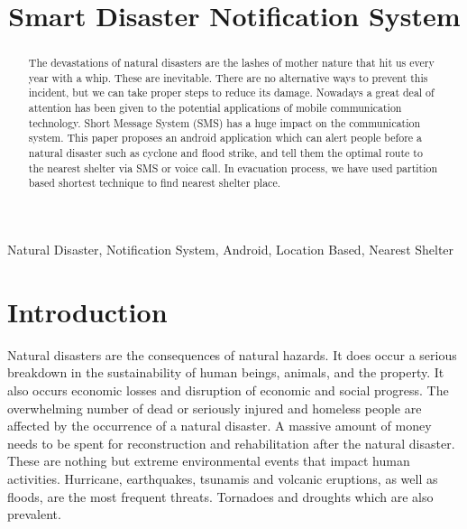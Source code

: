 \documentclass[conference]{IEEEtran}
\title{Smart Disaster Notification System}
\begin{document}
%




\author{
}

\maketitle


\begin{abstract}
The devastations of natural disasters are the lashes of mother nature that hit us every year with a whip. These are inevitable. There are no alternative ways to prevent this incident, but we can take proper steps to reduce its damage. Nowadays a great deal of attention has been given to the potential applications of mobile communication technology. Short Message System (SMS) has a huge impact on the communication system. This paper proposes an android application which can alert people before a natural disaster such as cyclone and flood strike, and tell them the optimal route to the nearest shelter via SMS or voice call. In evacuation process, we have used partition based shortest technique to find nearest shelter place. 

\end{abstract}

\begin{IEEEkeywords}
Natural Disaster, Notification System, Android, Location Based, Nearest Shelter
\end{IEEEkeywords}

\IEEEpeerreviewmaketitle
\section{Introduction}
\label{sec:Intro}

Natural disasters are the consequences of natural hazards. It does occur a serious breakdown in the sustainability of human beings, animals, and the property. It also occurs economic losses and disruption of economic and social progress. The overwhelming number of dead or seriously injured and homeless people are affected by the occurrence of a natural disaster. A massive amount of money needs to be spent for reconstruction and rehabilitation after the natural disaster. These are nothing but extreme environmental events that impact human activities. Hurricane, earthquakes, tsunamis and volcanic eruptions, as well as floods, are the most frequent threats\cite{khalid2015flood}. Tornadoes and droughts which are also prevalent.
\end{document}
